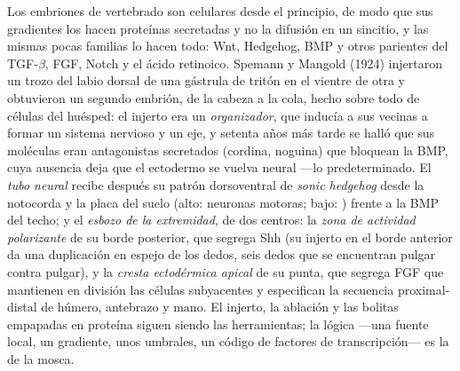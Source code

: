 \begin{definition}\label{def:b3:developmental-genetics:organiser}
Los embriones de vertebrado son celulares desde el principio, de modo
que sus gradientes los hacen proteínas secretadas y no la difusión en
un sincitio, y las mismas pocas familias lo hacen todo: Wnt, Hedgehog,
BMP y otros parientes del TGF-$\beta$, FGF, Notch y el ácido retinoico.
Spemann y Mangold (1924) injertaron un trozo del labio dorsal de una
gástrula de tritón en el vientre de otra y obtuvieron un segundo
embrión, de la cabeza a la cola, hecho sobre todo de células del
huésped: el injerto era un \emph{organizador}, que inducía a sus
vecinas a formar un sistema nervioso y un eje, y setenta años más tarde
se halló que sus moléculas eran antagonistas secretados (cordina,
noguina) que bloquean la BMP, cuya ausencia deja que el ectodermo se
vuelva neural ---lo predeterminado. El \emph{tubo neural} recibe
después su patrón dorsoventral de \emph{sonic hedgehog} desde la
notocorda y la placa del suelo (alto: neuronas motoras; bajo:
) frente a la BMP del techo; y el \emph{esbozo de la
extremidad}, de dos centros: la \emph{zona de actividad polarizante} de
su borde posterior, que segrega Shh (su injerto en el borde anterior da
una duplicación en espejo de los dedos, seis dedos que se encuentran
pulgar contra pulgar), y la \emph{cresta ectodérmica apical} de su
punta, que segrega FGF que mantienen en división las células
subyacentes y especifican la secuencia proximal-distal de húmero,
antebrazo y mano. El injerto, la ablación y las bolitas empapadas en
proteína siguen siendo las herramientas; la lógica ---una fuente local,
un gradiente, unos umbrales, un código de factores de transcripción---
es la de la mosca.
\end{definition}

